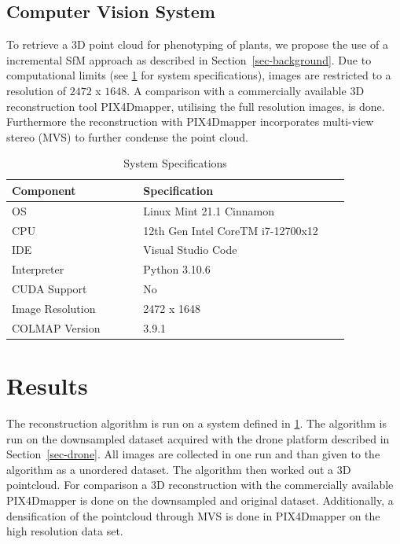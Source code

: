 \documentclass[conference,]{IEEEtran}
\begin{document}
\hypertarget{computer-vision-system}{%
\subsection{Computer Vision System}\label{computer-vision-system}}

To retrieve a 3D point cloud for phenotyping of plants, we propose the
use of a incremental SfM approach as described in
Section~\ref{sec-background}. Due to computational limits (see
\cref{table_system_specs} for system specifications), images are
restricted to a resolution of \(2472\) x \(1648\). A comparison with a
commercially available 3D reconstruction tool PIX4Dmapper, utilising the
full resolution images, is done. Furthermore the reconstruction with
PIX4Dmapper incorporates multi-view stereo (MVS) to further condense the
point cloud.

\begin{table}
    \renewcommand{\arraystretch}{1.3}
    \caption{System Specifications}
    \label{table_system_specs}
    \centering
    \begin{tabular}{|>{\raggedright}p{0.35\linewidth}|p{0.55\linewidth}|}
        \hline
        \textbf{Component} & \textbf{Specification}\\
        \hline
        OS & Linux Mint 21.1 Cinnamon\\
        \hline
        CPU & 12th Gen Intel CoreTM i7-12700x12\\
        \hline
        IDE & Visual Studio Code\\
        \hline
        Interpreter & Python 3.10.6\\
        \hline
        CUDA Support & No\\
        \hline
        Image Resolution & 2472 x 1648\\
        \hline
        COLMAP Version & 3.9.1\\
        \hline
    \end{tabular}
\end{table}

\hypertarget{sec-results}{%
\section{Results}\label{sec-results}}

The reconstruction algorithm is run on a system defined in
\cref{table_system_specs}. The algorithm is run on the downsampled
dataset acquired with the drone platform described in
Section~\ref{sec-drone}. All images are collected in one run and than
given to the algorithm as a unordered dataset. The algorithm then worked
out a 3D pointcloud. For comparison a 3D reconstruction with the
commercially available PIX4Dmapper is done on the downsampled and
original dataset. Additionally, a densification of the pointcloud
through MVS is done in PIX4Dmapper on the high resolution data set.
\end{document}
